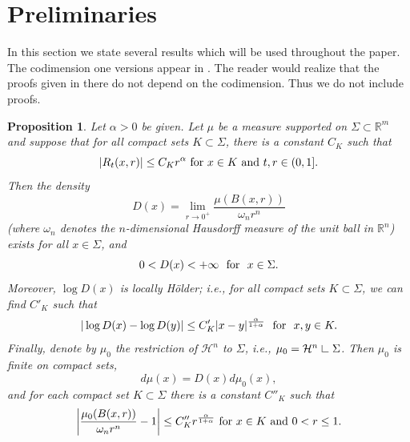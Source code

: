 \documentclass[12pt,leqno]{article}
\newcommand{\res}{\hbox{ {\vrule height .22cm}{\leaders\hrule\hskip.2cm} } }
\newcommand{\RR}{\mathbb{R}}
\renewcommand{\H}{\mathcal{H}}
\theoremstyle{plain}
\newtheorem{prop}[thm]{Proposition}
{\theorembodyfont{\rmfamily}
\newtheorem{defn}[thm]{Definition}}
{\theorembodyfont{\rmfamily}
\newtheorem{rem}[thm]{Remark}}
\numberwithin{equation}{section}
\begin{document}
\section{Preliminaries}

In this section we state several results which will be used throughout the
paper. The codimension one versions appear in \cite{DKT}. The reader would
realize that the proofs given in there do not depend on the codimension.
Thus we do not include proofs.



\begin{prop}\label{prop:6.2}
Let $\alpha>0$ be given. Let $\mu$ be a measure supported on
$\Sigma\subset\RR^m$ and suppose that for all compact sets $K\subset
\Sigma$, there is a constant $C_K$ such that
\begin{equation}\label{eqn:6.3}
|R_t(x,r)|\le C_Kr^\alpha\hbox{ for }x\in K\hbox{ and }t, r\in(0,1].
\end{equation}
Then the density
\begin{equation}\label{eqn:6.4}
D(x)=\lim_{r\to 0^+} \frac{\mu(B(x,r))}{\omega_nr^n}
\end{equation}
(where $\omega_n$ denotes the $n$-dimensional Hausdorff measure of
the unit ball
in $\RR^n$) exists for all $x\in\Sigma$, and
\begin{equation}\label{eqn:6.5}
0<D(x)<+\infty\ \hbox{ for }\ x\in \Sigma.
\end{equation}
Moreover, $\log D(x)$ is locally H\"older; i.e., for all compact sets
$K\subset\Sigma$, we can find $C'_K$ such that
\begin{equation}\label{eqn:6.6}
|\log D(x)-\log D(y)|\le C'_K|x-y|^{\frac{\alpha}{1+\alpha}}\ \hbox{ for }\  x,
y\in K.
\end{equation}
Finally, denote by $\mu_0$ the restriction of $\H^n$ to $\Sigma$, i.e.,
$\mu_0=\H^n \res\Sigma$. Then $\mu_0$ is finite on compact sets,
\begin{equation}\label{eqn:6.7}
d\mu(x)=D(x)d\mu_0(x),
\end{equation}
and for each compact set $K\subset\Sigma$ there is a constant $C''_K$ such
that
\begin{equation}\label{eqn:6.8}
\left|\frac{\mu_0(B(x,r))}{\omega_nr^n}-1\right|\le C''_K
r^{\frac{\alpha}{1+\alpha}}\hbox{ for }x\in K \hbox{ and }0<r\le 1.
\end{equation}
\end{prop}
\end{document}
